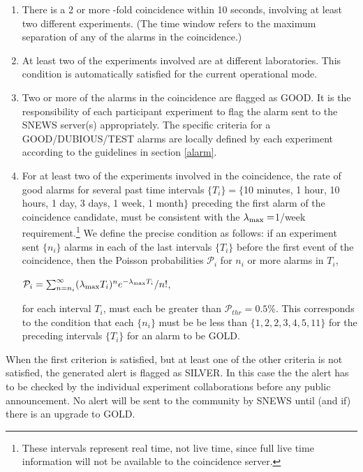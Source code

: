 \documentclass{article}
\begin{document}
\begin{enumerate}

\item There is a 2 or more -fold coincidence within 10 seconds,
involving at least two different experiments. 
(The time window refers to the maximum
separation of any of the alarms in the coincidence.)

\item At least two of the experiments involved
are at different laboratories.  This condition is automatically
satisfied for the current operational mode.

\item Two or more of the alarms in the coincidence
are flagged as GOOD.  It is the responsibility of each participant
experiment to flag the alarm sent to the SNEWS server(s)
appropriately. The specific criteria for a GOOD/DUBIOUS/TEST alarms
are locally defined by each experiment according to the guidelines 
in section \ref{alarm}.
  
 \item For at least two of the experiments involved in the
 coincidence, the rate of good alarms for several past time intervals
 $\{T_i\}=\{$10 minutes, 1 hour, 10 hours, 1 day, 3 days, 1 week, 1
 month$\}$ preceding the first alarm of the coincidence candidate, 
 must be consistent with the $\lambda_{\rm{max}}=$1/week
 requirement.\footnote{These intervals represent real time, not live
 time, since full live time information will not be available to the
 coincidence server.}  We define the precise condition as follows: if
 an experiment sent $\{n_i\}$ alarms in each of the last intervals
 $\{T_i\}$ before the first event of the coincidence, then the Poisson probabilities $\mathcal{P}_i$ for $n_i$
 or more alarms in $T_i$,

$\mathcal{P}_i=\sum_{n=n_i}^{\infty}(\lambda_{\rm{max}} T_i)^{n}e^{-\lambda_{\rm{max}} T_i}/n!$,

for each interval $T_i$, must each be greater than $\mathcal{P}_{thr}=0.5$\%.
This corresponds to the condition that each $\{n_i\}$ must be be less
than $\{1,2,2,3,4,5,11\}$ for the preceding intervals $\{T_i\}$ for an
alarm to be GOLD.

\end{enumerate}

When the first criterion is satisfied, but at least one of the other
criteria is not satisfied, the generated alert is flagged as SILVER.
In this case the the alert has to be checked by the individual
experiment collaborations before any public announcement. No alert
will be sent to the community by SNEWS until (and if) there is an
upgrade to GOLD.
\end{document}
